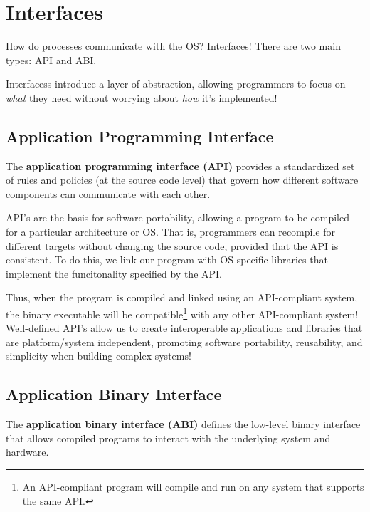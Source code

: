 \documentclass{report}
\begin{document}
\chapter{Interfaces}
How do processes communicate with the OS? Interfaces! There are two main types: API and ABI.

\begin{tcolorbox}[colback=violet!5!white,colframe=violet,title=Abstraction: Interfaces] 
  Interfacess introduce a layer of abstraction, allowing programmers to focus on \textit{what} they need
  without worrying about \textit{how} it's implemented! 
\end{tcolorbox}


\section{Application Programming Interface}
\begin{tcolorbox}[title=Definition: Application Programming Interface]
  The \textbf{application programming interface (API)} provides a standardized set of rules and
  policies (at the source code level) that govern how different software components can communicate
  with each other.
\end{tcolorbox}

API's are the basis for software portability, allowing a program to be compiled for a particular
architecture or OS. That is, programmers can recompile for different targets without changing the source
code, provided that the API is consistent. To do this, we link our program with OS-specific
libraries that implement the funcitonality specified by the API.

Thus, when the program is compiled and linked using an API-compliant system, the binary executable
will be compatible\footnote{An API-compliant program will compile and run on any system that
  supports the same API.} with any other API-compliant system! Well-defined API's allow us to create
interoperable applications and libraries that are platform/system independent, promoting software
portability, reusability, and simplicity when building complex systems!


\section{Application Binary Interface}
\begin{tcolorbox}[title=Definition: Application Binary Interface]
  The \textbf{application binary interface (ABI)} defines the low-level binary interface that allows
  compiled programs to interact with the underlying system and hardware.
\end{tcolorbox}
\end{document}
